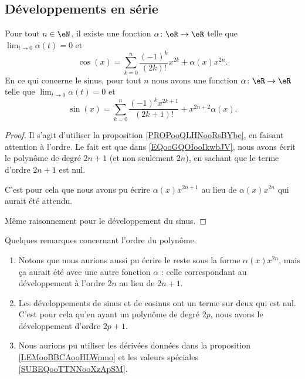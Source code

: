 \subsection{Développements en série}

\begin{proposition}     \label{PROPooNPYXooTuwAHP}
	Pour tout \( n\in  \eN\), il existe une fonction \( \alpha\colon \eR\to \eR\) telle que \( \lim_{t\to 0} \alpha(t)=0\) et
	\begin{equation}        \label{EQooGQOIooIkwbJV}
		\cos(x)=\sum_{k=0}^{n}\frac{ (-1)^{k} }{ (2k)! }x^{2k}+\alpha(x)x^{2n}.
	\end{equation}
	En ce qui concerne le sinus, pour tout \( n\) nous avons une fonction \( \alpha\colon \eR\to \eR\) telle que \( \lim_{t\to 0} \alpha(t)=0\) et
	\begin{equation}        \label{EQooKYJAooRebHgc}
		\sin(x)=\sum_{k=0}^n\frac{ (-1)^kx^{2k+1} }{ (2k+1)! }+x^{2n+2}\alpha(x).
	\end{equation}
\end{proposition}

\begin{proof}
	Il s'agit d'utiliser la proposition \ref{PROPooQLHNooRsBYbe}, en faisant attention à l'ordre. Le fait est que dans \eqref{EQooGQOIooIkwbJV}, nous avons écrit le polynôme de degré \( 2n+1\) (et non seulement \( 2n\)), en sachant que le terme d'ordre \( 2n+1\) est nul.

	C'est pour cela que nous avons pu écrire \( \alpha(x)x^{2n+1}\) au lieu de \( \alpha(x)x^{2n}\) qui aurait été attendu.

	Même raisonnement pour le développement du sinus.
\end{proof}

\begin{remark}
	Quelques remarques concernant l'ordre du polynôme.
	\begin{enumerate}
		\item
		      Notons que nous aurions aussi pu écrire le reste sous la forme \( \alpha(x)x^{2n}\), mais ça aurait été avec une autre fonction \( \alpha\) : celle correspondant au développement à l'ordre \( 2n\) au lieu de \( 2n+1\).
		\item

		      Les développements de sinus et de cosinus ont un terme sur deux qui est nul. C'est pour cela qu'en ayant un polynôme de degré \( 2p\), nous avons le développement d'ordre \( 2p+1\).
		\item
		      Nous aurions pu utiliser les dérivées données dans la proposition \ref{LEMooBBCAooHLWmno} et les valeurs spéciales \eqref{SUBEQooTTNNooXzApSM}.
	\end{enumerate}
\end{remark}

